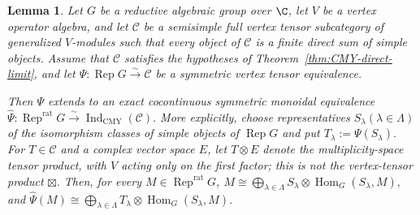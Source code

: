 \documentclass[12pt,leqno]{amsart}
\numberwithin{equation}{section} \newtheorem{thm}{Theorem}[section] \newtheorem{lem}[thm]{Lemma} \newtheorem{ex}[thm]{Example} \newtheorem{prop}[thm]{Proposition} \newtheorem{cor}[thm]{Corollary} \newtheorem{defi}[thm]{Definition} \newtheorem{rmk}[thm]{Remark} \newtheorem{notation}[thm]{Notation}
\newcommand{\Rep}{\operatorname{Rep}}
\newcommand{\Hom}{\operatorname{Hom}}
\newcommand{\IndCMY}{\operatorname{Ind}_{\mathrm{CMY}}}
\begin{document}
\begin{lem}
\label{lem:ind-equivalence}
Let $G$ be a reductive algebraic group over $\C$, let $V$ be a vertex operator algebra, and let $\mathcal C$ be a semisimple full vertex tensor subcategory of generalized $V$-modules such that every object of $\mathcal C$ is a finite direct sum of simple objects. Assume that $\mathcal C$ satisfies the hypotheses of Theorem~\ref{thm:CMY-direct-limit}, and let \(\Psi:\Rep G\overset{\sim}{\longrightarrow}\mathcal C\) be a symmetric vertex tensor equivalence.

Then $\Psi$ extends to an exact cocontinuous symmetric monoidal equivalence \(\widehat\Psi:\Rep^{\mathrm{rat}}G\overset{\sim}{\longrightarrow}\IndCMY(\mathcal C).\) More explicitly, choose representatives ${S_\lambda}(\lambda\in\Lambda)$ of the isomorphism classes of simple objects of $\Rep G$ and put $ T_\lambda:=\Psi(S_\lambda). $ For $T\in\mathcal C$ and a complex vector space $E$, let $T\otimes E$ denote the multiplicity-space tensor product, with $V$ acting only on the first factor; this is not the vertex-tensor product $\boxtimes$. Then, for every $M\in\Rep^{\mathrm{rat}}G$, \(M\cong\bigoplus_{\lambda\in\Lambda}S_\lambda\otimes\Hom_G(S_\lambda,M),\) and \(\widehat\Psi(M)\cong\bigoplus_{\lambda\in\Lambda}T_\lambda\otimes\Hom_G(S_\lambda,M).\)
\end{lem}
\end{document}
